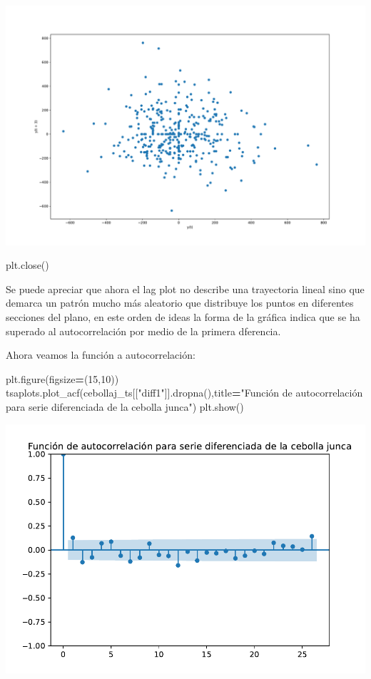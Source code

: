 \documentclass[
]{book}
\newenvironment{Shaded}{\begin{snugshade}}{\end{snugshade}}
\newcommand{\DecValTok}[1]{\textcolor[rgb]{0.00,0.00,0.81}{#1}}
\newcommand{\NormalTok}[1]{#1}
\newcommand{\OperatorTok}[1]{\textcolor[rgb]{0.81,0.36,0.00}{\textbf{#1}}}
\newcommand{\StringTok}[1]{\textcolor[rgb]{0.31,0.60,0.02}{#1}}
\begin{document}
\includegraphics{bookdown-demo_files/figure-latex/unnamed-chunk-61-25.pdf}

\begin{Shaded}
\begin{Highlighting}[]
\NormalTok{plt.close()}
\end{Highlighting}
\end{Shaded}

Se puede apreciar que ahora el lag plot no describe una trayectoria lineal sino que demarca un patrón mucho más aleatorio que distribuye los puntos en diferentes secciones del plano, en este orden de ideas la forma de la gráfica indica que se ha superado al autocorrelación por medio de la primera dferencia.

Ahora veamos la función a autocorrelación:

\begin{Shaded}
\begin{Highlighting}[]

\NormalTok{plt.figure(figsize}\OperatorTok{=}\NormalTok{(}\DecValTok{15}\NormalTok{,}\DecValTok{10}\NormalTok{))}
\NormalTok{tsaplots.plot\_acf(cebollaj\_ts[[}\StringTok{"diff1"}\NormalTok{]].dropna(),title}\OperatorTok{=}\StringTok{"Función de autocorrelación para serie diferenciada de la cebolla junca"}\NormalTok{)}
\NormalTok{plt.show()}
\end{Highlighting}
\end{Shaded}

\includegraphics{bookdown-demo_files/figure-latex/unnamed-chunk-62-27.pdf}
\end{document}
